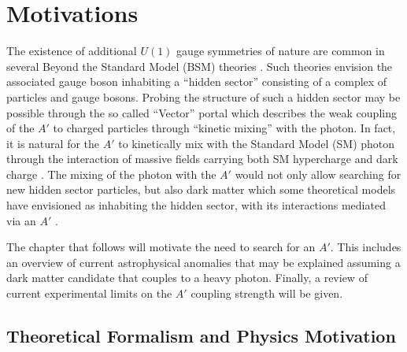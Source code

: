 
\chapter{Motivations}

The existence of additional $U(1)$ gauge symmetries of nature are common in
several Beyond the Standard Model (BSM) theories 
\cite{Goodsell:2010ie, Abel:2008ai, Candelas:1985en, Andreas:2011in, Jaeckel:2010ni}.
Such theories envision the associated gauge boson  inhabiting a  ``hidden sector'' 
consisting of a complex of 
particles and gauge bosons.  Probing the structure of such a hidden sector may
be possible through the so called ``Vector'' portal which describes  
the weak coupling of the $A'$ to charged particles through ``kinetic mixing''
with the photon. In fact, it is natural for the $A'$ to 
kinetically mix with the Standard Model (SM) photon through the interaction
of massive fields carrying both SM hypercharge and dark charge \cite{Holdom:1985ag}.
The mixing of the photon with the $A'$ would not only allow searching for
new hidden sector particles, but also dark matter which some theoretical models
have envisioned as inhabiting the hidden sector, with its interactions mediated
via an $A'$ 
\cite{ArkaniHamed:2008qn, Pospelov:2008jd, cheung2009, ArkaniHamed:2008qp}.

The chapter that follows will motivate the need to search for an $A'$.  
This includes an overview of current astrophysical anomalies
that may be explained assuming a dark matter candidate that couples to a 
heavy photon.  Finally, a review of current experimental limits on the $A'$ 
coupling strength will be given.

\section{Theoretical Formalism and Physics Motivation}

